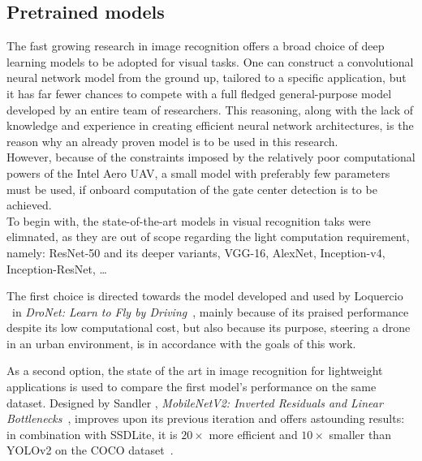 \subsection{Pretrained models}

The fast growing research in image recognition offers a broad choice of deep
learning models to be adopted for visual tasks. One can construct a
convolutional neural network model from the ground up, tailored to a specific
application, but it has far fewer chances to compete with a full fledged
general-purpose model developed by an entire team of researchers. This
reasoning, along with the lack of knowledge and experience in creating
efficient neural network architectures, is the reason why an already proven
model is to be used in this research.\\

However, because of the constraints imposed by the relatively poor
computational powers of the Intel Aero UAV, a small model with preferably few
parameters must be used, if onboard computation of the gate center detection is
to be achieved.\\

To begin with, the state-of-the-art models in visual recognition taks were
elimnated, as they are out of scope regarding the light computation 
requirement, namely: ResNet-50 and its deeper variants, VGG-16, AlexNet,
Inception-v4, Inception-ResNet, \etc \ldots

The first choice is directed towards the model developed and used by Loquercio
\etal~in \emph{DroNet: Learn to Fly by Driving}~\cite{dronet}, mainly because
of its praised performance despite its low computational cost, but also because
its purpose, steering a drone in an urban environment, is in accordance with
the goals of this work.

As a second option, the state of the art in image recognition for lightweight
applications is used to compare the first model's performance on the same
dataset. Designed by Sandler \etal, \emph{MobileNetV2: Inverted Residuals and
Linear Bottlenecks}~\cite{MobileNetV2}, improves upon its previous iteration
and offers astounding results: in combination with SSDLite, it is $20\times$ more
efficient and $10\times$ smaller than YOLOv2 on the COCO dataset~\cite{MobileNetV2}.
